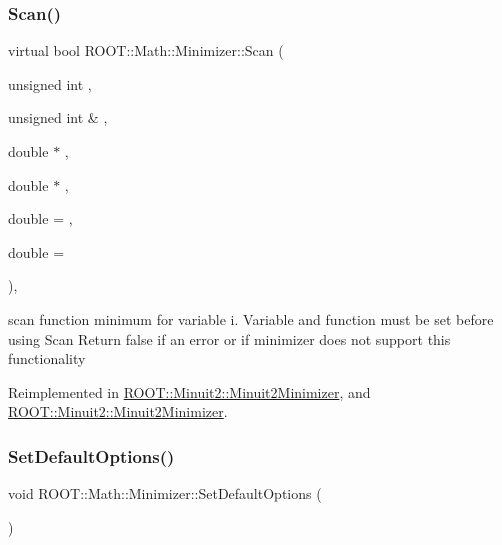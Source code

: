 \subsubsection{\texorpdfstring{Scan()}{Scan()}\hspace{0.1cm}{\footnotesize\ttfamily [2/2]}}
{\footnotesize\ttfamily virtual bool R\+O\+O\+T\+::\+Math\+::\+Minimizer\+::\+Scan (\begin{DoxyParamCaption}\item[{unsigned int}]{,  }\item[{unsigned int \&}]{,  }\item[{double $\ast$}]{,  }\item[{double $\ast$}]{,  }\item[{double}]{ = {},  }\item[{double}]{ = {} }\end{DoxyParamCaption})\hspace{0.3cm}{\ttfamily [inline]}, {\ttfamily [virtual]}}

scan function minimum for variable i. Variable and function must be set before using Scan Return false if an error or if minimizer does not support this functionality 

Reimplemented in \mbox{\hyperlink{classROOT_1_1Minuit2_1_1Minuit2Minimizer_a3f2f94c743a9b120a71da5ba23bd88cb}{R\+O\+O\+T\+::\+Minuit2\+::\+Minuit2\+Minimizer}}, and \mbox{\hyperlink{classROOT_1_1Minuit2_1_1Minuit2Minimizer_a3f2f94c743a9b120a71da5ba23bd88cb}{R\+O\+O\+T\+::\+Minuit2\+::\+Minuit2\+Minimizer}}.

\mbox{\label{classROOT_1_1Math_1_1Minimizer_a4811690d47537dbc0ab09d50d57ce34f}} 
\subsubsection{\texorpdfstring{SetDefaultOptions()}{SetDefaultOptions()}\hspace{0.1cm}{\footnotesize\ttfamily [1/2]}}
{\footnotesize\ttfamily void R\+O\+O\+T\+::\+Math\+::\+Minimizer\+::\+Set\+Default\+Options (\begin{DoxyParamCaption}{ }\end{DoxyParamCaption})\hspace{0.3cm}{\ttfamily [inline]}}



